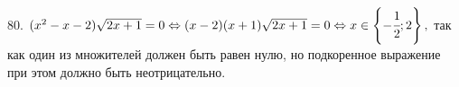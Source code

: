 80. $(x^2-x-2)\sqrt{2x+1}=0\Leftrightarrow (x-2)(x+1)\sqrt{2x+1}=0\Leftrightarrow x\in\left\{-\cfrac{1}{2};2\right\},$ так как один из множителей должен быть равен нулю, но подкоренное выражение при этом должно быть неотрицательно.\\
